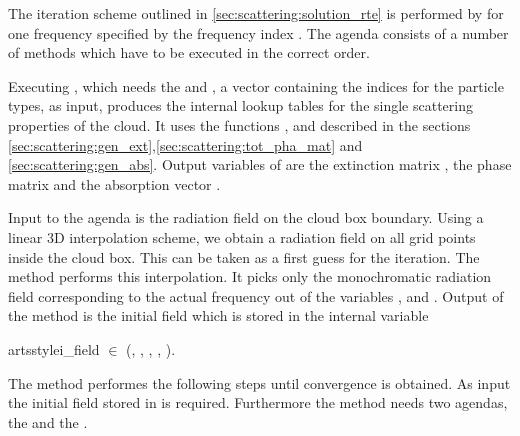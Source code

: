 \label{sec:scattering:scat_mono_ag}

The iteration scheme outlined in \ref{sec:scattering:solution_rte} is
performed by  for one frequency specified
by the frequency index . 
The agenda consists of a number of methods which have to be executed in
the correct order.


Executing , which needs the
 and , a vector
containing the indices for the
particle types, as input, produces 
the internal lookup tables for the
single scattering properties of the cloud. It uses the functions   
, 
and  
described in the sections
\ref{sec:scattering:gen_ext},\ref{sec:scattering:tot_pha_mat} and
\ref{sec:scattering:gen_abs}.  
Output variables of  are the
extinction matrix
, the phase matrix 
and the absorption vector .

Input to the agenda is the radiation field on the cloud
box boundary.
Using a linear 3D interpolation scheme, we obtain a
radiation field on all grid points inside the cloud box.
This can be taken as a first guess for the iteration. The method
 performs this
interpolation. It picks only the monochromatic radiation field
corresponding to the actual frequency out of the variables
,  and
. Output of the method is the initial field 
which is stored in the internal variable
\begin{center}
  artsstyle{i\_field} $\in$ (\ScaP, \ScaLat, \ScaLon, \ScaZa,
\ScaAa). 
\end{center}


The method  performes the following steps 
until convergence is obtained. As input the initial field stored in
 is required. Furthermore the method needs two
agendas, the  and the
.


